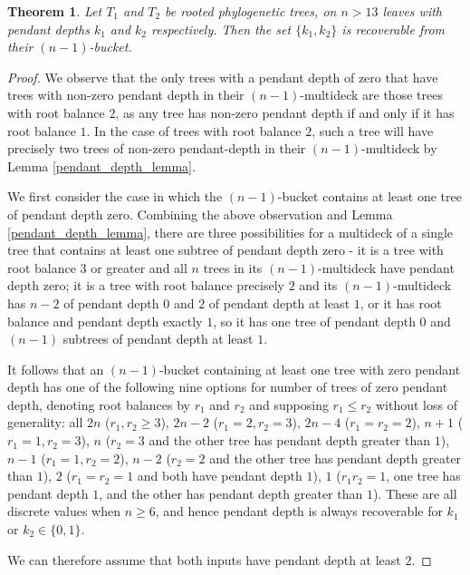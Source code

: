 \documentclass[12pt]{article}
\newtheorem{Theorem}{Theorem}[section]
\theoremstyle{definition}
\begin{document}
\begin{Theorem}\label{t:pendant.depth.recoverable}
    Let $T_1$ and $T_2$ be rooted phylogenetic trees, on $n>13$ leaves with pendant depths $k_1$ and $k_2$ respectively. Then the set $\{k_1, k_2\}$ is recoverable from their $(n-1)$-bucket.
\end{Theorem}

\begin{proof}
    We observe that the only trees with a pendant depth of zero that have trees with non-zero pendant depth in their $(n-1)$-multideck are those trees with root balance $2$, as any tree has non-zero pendant depth if and only if it has root balance $1$. In the case of trees with root balance $2$, such a tree will have precisely two trees of non-zero pendant-depth in their $(n-1)$-multideck by Lemma \ref{pendant_depth_lemma}.

    We first consider the case in which the $(n-1)$-bucket contains at least one tree of pendant depth zero. Combining the above observation and Lemma \ref{pendant_depth_lemma}, there are three possibilities for a multideck of a single tree that contains at least one subtree of pendant depth zero - it is a tree with root balance $3$ or greater and all $n$ trees in its $(n-1)$-multideck have pendant depth zero; it is a tree with root balance precisely $2$ and its $(n-1)$-multideck has $n-2$ of pendant depth $0$ and $2$ of pendant depth at least $1$, or it has root balance and pendant depth exactly $1$, so it has one tree of pendant depth $0$ and $(n-1)$ subtrees of pendant depth at least $1$.

    It follows that an $(n-1)$-bucket containing at least one tree with zero pendant depth has one of the following nine options for number of trees of zero pendant depth, denoting root balances by $r_1$ and $r_2$ and supposing $r_1 \le r_2$ without loss of generality: all $2n$ ($r_1,r_2\ge 3$), $2n-2$ ($r_1=2,r_2=3$), $2n-4$ ($r_1=r_2=2$), $n+1$ ($r_1=1,r_2=3$), $n$ ($r_2=3$ and the other tree has pendant depth greater than $1$), $n-1$ ($r_1=1,r_2=2$), $n-2$ ($r_2=2$ and the other tree has pendant depth greater than $1$), $2$ ($r_1=r_2=1$ and both have pendant depth $1$), $1$ ($r_1r_2=1$, one tree has pendant depth $1$, and the other has pendant depth greater than $1$). These are all discrete values when $n \ge 6$, and hence pendant depth is always recoverable for $k_1$ or $k_2 \in \{0,1\}$.

    We can therefore assume that both inputs have pendant depth at least $2$.


\end{proof}
\end{document}
